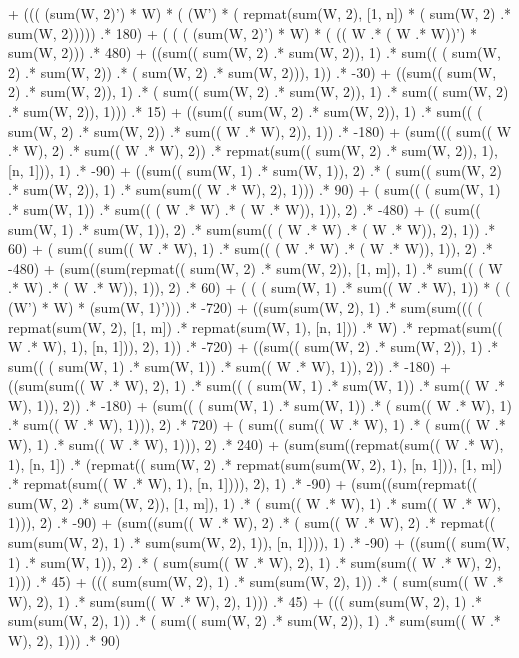 \documentclass{article}
\begin{document}
  + ((( (sum(W, 2)') * W)  * ( (W') * ( repmat(sum(W, 2), [1, n]) * ( sum(W, 2) .* sum(W, 2)))))  .* 180) 
  + ( ( ( (sum(W, 2)') * W) * ( (( W .* ( W .* W))') * sum(W, 2))) .* 480) 
  + ((sum(( sum(W, 2) .* sum(W, 2)), 1)  .* sum(( ( sum(W, 2) .* sum(W, 2)) .* ( sum(W, 2) .* sum(W, 2))), 1))  .* -30) 
  + ((sum(( sum(W, 2) .* sum(W, 2)), 1)  .* ( sum(( sum(W, 2) .* sum(W, 2)), 1) .* sum(( sum(W, 2) .* sum(W, 2)), 1)))  .* 15) 
  + ((sum(( sum(W, 2) .* sum(W, 2)), 1)  .* sum(( ( sum(W, 2) .* sum(W, 2)) .* sum(( W .* W), 2)), 1))  .* -180) 
  + (sum((( sum(( W .* W), 2) .* sum(( W .* W), 2))  .* repmat(sum(( sum(W, 2) .* sum(W, 2)), 1), [n, 1])), 1)  .* -90) 
  + ((sum(( sum(W, 1) .* sum(W, 1)), 2)  .* ( sum(( sum(W, 2) .* sum(W, 2)), 1) .* sum(sum(( W .* W), 2), 1)))  .* 90) 
  + ( sum(( ( sum(W, 1) .* sum(W, 1)) .* sum(( ( W .* W) .* ( W .* W)), 1)), 2) .* -480) 
  + (( sum(( sum(W, 1) .* sum(W, 1)), 2) .* sum(sum(( ( W .* W) .* ( W .* W)), 2), 1))  .* 60) 
  + ( sum(( sum(( W .* W), 1) .* sum(( ( W .* W) .* ( W .* W)), 1)), 2) .* -480) 
  + (sum((sum(repmat(( sum(W, 2) .* sum(W, 2)), [1, m]), 1)  .* sum(( ( W .* W) .* ( W .* W)), 1)), 2)  .* 60) 
  + ( ( ( sum(W, 1) .* sum(( W .* W), 1)) * ( ( (W') * W) * (sum(W, 1)'))) .* -720) 
  + ((sum(sum(W, 2), 1)  .* sum(sum((( ( repmat(sum(W, 2), [1, m]) .* repmat(sum(W, 1), [n, 1])) .* W)  .* repmat(sum(( W .* W), 1), [n, 1])), 2), 1))  .* -720) 
  + ((sum(( sum(W, 2) .* sum(W, 2)), 1)  .* sum(( ( sum(W, 1) .* sum(W, 1)) .* sum(( W .* W), 1)), 2))  .* -180) 
  + ((sum(sum(( W .* W), 2), 1)  .* sum(( ( sum(W, 1) .* sum(W, 1)) .* sum(( W .* W), 1)), 2))  .* -180) 
  + (sum(( ( sum(W, 1) .* sum(W, 1)) .* ( sum(( W .* W), 1) .* sum(( W .* W), 1))), 2)  .* 720) 
  + ( sum(( sum(( W .* W), 1) .* ( sum(( W .* W), 1) .* sum(( W .* W), 1))), 2) .* 240) 
  + (sum(sum((repmat(sum(( W .* W), 1), [n, 1])  .* (repmat(( sum(W, 2) .* repmat(sum(sum(W, 2), 1), [n, 1])), [1, m])  .* repmat(sum(( W .* W), 1), [n, 1]))), 2), 1)  .* -90) 
  + (sum((sum(repmat(( sum(W, 2) .* sum(W, 2)), [1, m]), 1)  .* ( sum(( W .* W), 1) .* sum(( W .* W), 1))), 2)  .* -90) 
  + (sum((sum(( W .* W), 2)  .* ( sum(( W .* W), 2) .* repmat(( sum(sum(W, 2), 1) .* sum(sum(W, 2), 1)), [n, 1]))), 1)  .* -90) 
  + ((sum(( sum(W, 1) .* sum(W, 1)), 2)  .* ( sum(sum(( W .* W), 2), 1) .* sum(sum(( W .* W), 2), 1)))  .* 45) 
  + ((( sum(sum(W, 2), 1) .* sum(sum(W, 2), 1))  .* ( sum(sum(( W .* W), 2), 1) .* sum(sum(( W .* W), 2), 1)))  .* 45) 
  + ((( sum(sum(W, 2), 1) .* sum(sum(W, 2), 1))  .* ( sum(( sum(W, 2) .* sum(W, 2)), 1) .* sum(sum(( W .* W), 2), 1)))  .* 90) 
\end{document}
